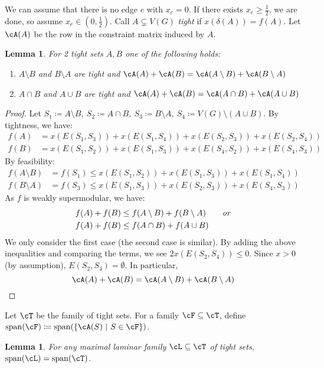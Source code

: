 \documentclass[11pt, a4paper]{article}
\newcommand{\mr}[1]{\mathrm{#1}}
\newcommand{\set}[1]{\{#1\}}
\newtheorem{lemma}[theorem]{Lemma}
\theoremstyle{remark}
\theoremstyle{definition}
\begin{document}
We can assume that there is no edge $e$ with $x_e=0$. If there exists
$x_e\geq\frac{1}{2}$, we are done, so assume $x_e\in(0,\frac{1}{2})$.
Call $A\subsetneq V(G)$ \emph{tight} if $x(\delta(A))=f(A)$. Let
$\cA(A)$ be the row in the constraint matrix induced by $A$.

\begin{lemma}
	For 2 tight sets $A,B$ one of the following holds:
	\begin{enumerate}
		\item $A\setminus B$ and $B\setminus A$ are tight and
		$\cA(A)+\cA(B)=\cA(A\setminus B)+\cA(B\setminus A)$

		\item $A\cap B$ and $A\cup B$ are tight and
		$\cA(A)+\cA(B)=\cA(A\cap B)+\cA(A\cup B)$
	\end{enumerate}
\end{lemma}
\begin{proof}
	Let $S_1\coloneqq A\setminus B,\ S_2\coloneqq A\cap B,\ S_3\coloneqq
		B\setminus A,\ S_4\coloneqq V(G)\setminus(A\cup B)$. By tightness,
	we have:
	\begin{align*}
		f(A) & =x(E(S_1,S_3))+x(E(S_1,S_4))+x(E(S_2,S_3))+x(E(S_2,S_4)) \\
		f(B) & =x(E(S_1,S_2))+x(E(S_1,S_3))+x(E(S_4,S_2))+x(E(S_4,S_3))
	\end{align*}
	By feasibility:
	\begin{align*}
		f(A\setminus B) & =f(S_1)\leq x(E(S_1,S_2))+x(E(S_1,S_3))+x(E(S_1,S_4)) \\
		f(B\setminus A) & =f(S_3)\leq x(E(S_1,S_3))+x(E(S_2,S_3))+x(E(S_4,S_3))
	\end{align*}
	As $f$ is weakly supermodular, we have:
	\begin{align*}
		f(A)+f(B) & \leq f(A\setminus B)+f(B\setminus A) \qquad\text{\emph{or}} \\
		f(A)+f(B) & \leq f(A\cap B)+f(A\cup B)
	\end{align*}
	We only consider the first case (the second case is similar). By adding
	the above inequalities and comparing the terms, we see $2x(E(S_2,S_4))
		\leq0$. Since $x>0$ (by assumption), $E(S_2,S_4)=\emptyset$. In particular,
	\[\cA(A)+\cA(B)=\cA(A\setminus B)+\cA(B\setminus A)\]
\end{proof}

Let $\cT$ be the family of tight sets. For a family
$\cF\subseteq\cT$, define
$\mr{span}(\cF)\coloneqq\mr{span}(\set{\cA(S)\ |\ S\in\cF})$.

\begin{lemma}
	For any maximal laminar family $\cL\subseteq\cT$ of tight sets,
	$\mr{span}(\cL)=\mr{span}(\cT)$.
\end{lemma}
\end{document}
